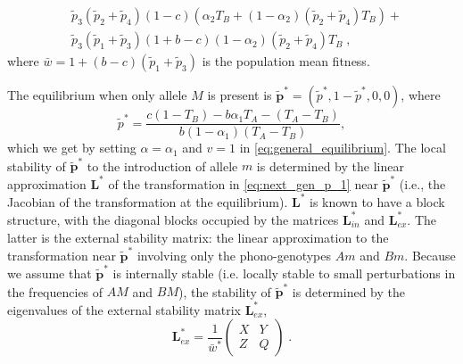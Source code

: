 \documentclass[12pt]{extarticle}
\let\vec\mathbf
\begin{document}
\begin{appendices}
\begin{equation}
\begin{aligned}
  & \tilde{p}_3(\tilde{p}_2 + \tilde{p}_4)(1-c)(\alpha_2T_B + (1-\alpha_2)(\tilde{p}_2 + \tilde{p}_4)T_B) + \\
  & \tilde{p}_3(\tilde{p}_1 + \tilde{p}_3)(1+b-c)(1-\alpha_2)(\tilde{p}_2 + \tilde{p}_4)T_B \;,
  \end{aligned}
\end{equation}
where $\bar{w} = 1 + (b-c)(\tilde{p}_1 + \tilde{p}_3)$ is the population mean fitness.%

The equilibrium when only allele $M$ is present is  $\vec{\tilde{p}^*} = (\tilde{p}^*, 1-\tilde{p}^*, 0, 0)$, where
\begin{equation} \label{eq:p_tilde_star_alpha_1}
\tilde{p}^*=
\frac{c(1-T_B) - b \alpha_1 T_A - (T_A - T_B)}{b(1-\alpha_1)(T_A-T_B)},
\end{equation}
which we get by setting $\alpha=\alpha_1$ and $v=1$ in \autoref{eq:general_equilibrium}.
The local stability of $\vec{\tilde{p}^*}$ to the introduction of allele $m$ is determined by the linear approximation $\vec{L}^*$ of the transformation in \autoref{eq:next_gen_p_1} near $\vec{\tilde{p}^*}$ (i.e., the Jacobian of the transformation at the equilibrium).
$\vec{L}^*$ is known to have a block structure, with the diagonal blocks occupied by the matrices $\vec{L}^*_{in}$ and $\vec{L}^*_{ex}$.
The latter is the external stability matrix: the linear approximation to the transformation near $\vec{\tilde{p}^*}$ involving only the phono-genotypes $Am$ and $Bm$.
Because we assume that $\vec{\tilde{p}^*}$ is internally stable (i.e. locally stable to small perturbations in the frequencies of $AM$ and $BM$), the stability of 
$\vec{\tilde{p}^*}$ is determined by the eigenvalues of the external stability matrix $\vec{L}^*_{ex}$, 
\begin{equation}
\mathbf{L}^*_{ex} = \frac{1}{\bar{w}^*} \begin{pmatrix}
	 X &
	 Y \\
	 Z &
	 Q 
\end{pmatrix} \;.
\end{equation}


\end{appendices}
\end{document}

